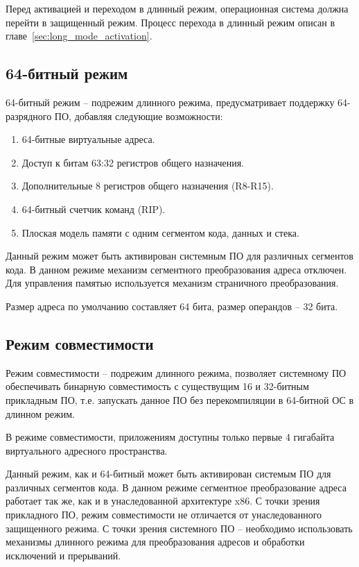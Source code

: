 Перед активацией и переходом в длинный режим, операционная система должна перейти в
защищенный режим. Процесс перехода в длинный режим описан в главе~\ref{sec:long_mode_activation}.

\subsection{64-битный режим}
64-битный режим -- подрежим длинного режима, предусматривает поддержку 64-разрядного
ПО, добавляя следующие возможности:
\begin{enumerate}[1.]
\item 64-битные виртуальные адреса.
\item Доступ к битам 63:32 регистров общего назначения.
\item Дополнительные 8 регистров общего назначения (R8-R15).
\item 64-битный счетчик команд (RIP).
\item Плоская модель памяти с одним сегментом кода, данных и стека.
\end{enumerate}

Данный режим может быть активирован системным ПО для различных сегментов кода. В данном режиме
механизм сегментного преобразования адреса отключен. Для управления памятью используется
механизм страничного преобразования.

Размер адреса по умолчанию составляет 64 бита, размер операндов -- 32 бита.

\subsection{Режим совместимости}
Режим совместимости -- подрежим длинного режима, позволяет системному ПО обеспечивать
бинарную совместимость с существущим 16 и 32-битным прикладным ПО,
т.е. запускать данное ПО без перекомпиляции в 64-битной ОС в длинном режим.

В режиме совместимости, приложениям доступны только первые 4 гигабайта виртуального адресного пространства.

Данный режим, как и 64-битный может быть активирован системым ПО для различных сегментов кода.
В данном режиме сегментное преобразование адреса работает так же, как и в унаследованной
архитектуре x86. С точки зрения прикладного ПО, режим совместимости не отличается от унаследованного
защищенного режима. С точки зрения системного ПО -- необходимо использовать механизмы длинного режима для
преобразования адресов и обработки исключений и прерываний.

